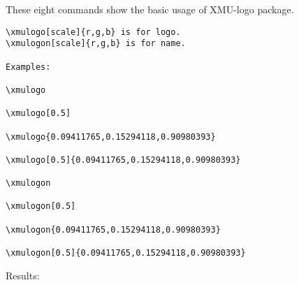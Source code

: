 \documentclass[11pt]{article}
\begin{document}
\Large These eight commands show the basic usage of XMU-logo package.

\begin{verbatim}
\xmulogo[scale]{r,g,b} is for logo.
\xmulogon[scale]{r,g,b} is for name.

Examples:

\xmulogo

\xmulogo[0.5]

\xmulogo{0.09411765,0.15294118,0.90980393}

\xmulogo[0.5]{0.09411765,0.15294118,0.90980393}

\xmulogon

\xmulogon[0.5]

\xmulogon{0.09411765,0.15294118,0.90980393}

\xmulogon[0.5]{0.09411765,0.15294118,0.90980393}
\end{verbatim}
\newpage

\Large Results:
\begin{center}
\xmulogo

\xmulogo[0.5]



\xmulogon

\xmulogon[0.5]




\end{center}
\end{document}
